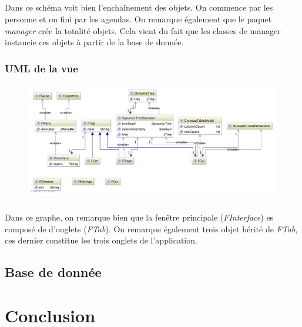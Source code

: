 \documentclass[a4paper,10pt]{report}
\begin{document}
			\paragraph*{}
			Dans ce schéma voit bien l’enchaînement des objets. On commence par les personne et on fini par les agendas. On remarque également que le paquet \textit{manager} crée la totalité objets. Cela vient du fait que les classes de manager instancie ces objets à partir de la base de donnée.

		\subsection{UML de la vue}

			\begin{figure}[h!]
				\includegraphics[scale=.5]{uml_fen.png}
				\centering
			\end{figure}

			\paragraph*{}
			Dans ce graphe, on remarque bien que la fenêtre principale (\textit{FInterface}) es composé de d’onglets (\textit{FTab}). On remarque également trois objet hérité de \textit{FTab}, ces dernier constitue les trois onglets de l'application.

	\section{Base de donnée}

\chapter*{Conclusion}
\end{document}
